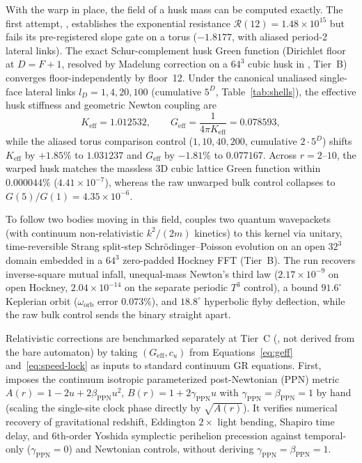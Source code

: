 With the warp in place, the field of a husk mass can be computed exactly. The first attempt, ,
establishes the exponential resistance $\mathcal{R}(12) = 1.48 \times 10^{15}$ but fails its pre-registered slope gate
on a \mbox{} torus ($-1.8177$, with aliased period-2 lateral links). The exact Schur-complement husk
Green function (Dirichlet floor at $D = F + 1$, resolved by Madelung
correction on a $64^3$ cubic husk in , Tier~B) converges floor-independently by floor~12. Under the
canonical unaliased single-face lateral links \mbox{$l_D = 1, 4, 20, 100$} (cumulative $5^D$, Table~\ref{tab:shells}),
the effective husk stiffness and geometric Newton coupling are
\begin{equation}
K_{\mathrm{eff}} = 1.012532,
\qquad
G_{\mathrm{eff}} = \frac{1}{4\pi K_{\mathrm{eff}}} = 0.078593,
\label{eq:geff}
\end{equation}
while the aliased \mbox{} torus comparison control ($1, 10, 40, 200$, cumulative $2 \cdot 5^D$) shifts
$K_{\mathrm{eff}}$ by $+1.85\%$ to $1.031237$ and $G_{\mathrm{eff}}$ by $-1.81\%$ to $0.077167$. Across $r = 2\text{--}10$,
the warped husk matches the massless 3D cubic lattice Green function within $0.000044\%$ ($4.41 \times 10^{-7}$),
whereas the raw unwarped bulk control collapses to \mbox{$G(5)/G(1) = 4.35 \times 10^{-6}$}.

To follow two bodies moving in this field,  couples two quantum wavepackets
(with continuum non-relativistic $k^2/(2m)$ kinetics) to this kernel via unitary, time-reversible Strang split-step Schr\"odinger--Poisson evolution on an open $32^3$ domain
embedded in a $64^3$ zero-padded Hockney FFT \cite{hockney1970} (Tier~B). The run recovers inverse-square mutual
infall, unequal-mass Newton's third law ($2.17 \times 10^{-9}$ on open Hockney, $2.04 \times 10^{-14}$ on the
separate periodic $T^3$ control), a bound $91.6^\circ$ Keplerian orbit ($\omega_{\mathrm{orb}}$ error $0.073\%$), and
$18.8^\circ$ hyperbolic flyby deflection, while the raw bulk control sends the binary straight apart.

Relativistic corrections are benchmarked separately at Tier~C (, not derived from the bare
automaton) by taking $(G_{\mathrm{eff}}, c_u)$ from Equations~\eqref{eq:geff} and~\eqref{eq:speed-lock} as inputs to
standard continuum GR equations. First,  imposes the continuum isotropic parameterized post-Newtonian
(PPN) metric $A(r) = 1 - 2u + 2\beta_{\mathrm{PPN}} u^2$, $B(r) = 1 + 2\gamma_{\mathrm{PPN}} u$ with
$\gamma_{\mathrm{PPN}} = \beta_{\mathrm{PPN}} = 1$ by hand (scaling the single-site clock phase directly by
$\sqrt{A(r)}$). It verifies numerical recovery of gravitational redshift, Eddington $2\times$ light bending, Shapiro
time delay, and 6th-order Yoshida symplectic perihelion precession \cite{yoshida1990} against temporal-only
($\gamma_{\mathrm{PPN}} = 0$) and Newtonian controls, without deriving $\gamma_{\mathrm{PPN}} = \beta_{\mathrm{PPN}} = 1$.

